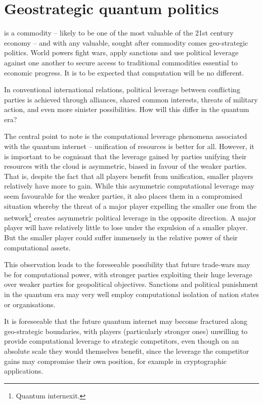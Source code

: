\section{Geostrategic quantum politics}

 is a commodity -- likely to be one of the most valuable of the 21st century economy -- and with any valuable, sought after commodity comes geo-strategic politics. World powers fight wars, apply sanctions and use political leverage against one another to secure access to traditional commodities essential to economic progress. It is to be expected that computation will be no different.

In conventional international relations, political leverage between conflicting parties is achieved through alliances, shared common interests, threats of military action, and even more sinister possibilities. How will this differ in the quantum era?

The central point to note is the computational leverage phenomena associated with the quantum internet -- unification of resources is better for all. However, it is important to be cognisant that the leverage gained by parties unifying their resources with the cloud is asymmetric, biased in favour of the weaker parties. That is, despite the fact that all players benefit from unification, smaller players relatively have more to gain. While this asymmetric computational leverage may seem favourable for the weaker parties, it also places them in a compromised situation whereby the threat of a major player expelling the smaller one from the network\footnote{Quantum internexit.} creates asymmetric political leverage in the opposite direction. A major player will have relatively little to lose under the expulsion of a smaller player. But the smaller player could suffer immensely in the relative power of their computational assets.

This observation leads to the foreseeable possibility that future trade-wars may be for computational power, with stronger parties exploiting their huge leverage over weaker parties for geopolitical objectives. Sanctions and political punishment in the quantum era may very well employ computational isolation of nation states or organisations.

It is foreseeable that the future quantum internet may become fractured along geo-strategic boundaries, with players (particularly stronger ones) unwilling to provide computational leverage to strategic competitors, even though on an absolute scale they would themselves benefit, since the leverage the competitor gains may compromise their own position, for example in cryptographic applications.

